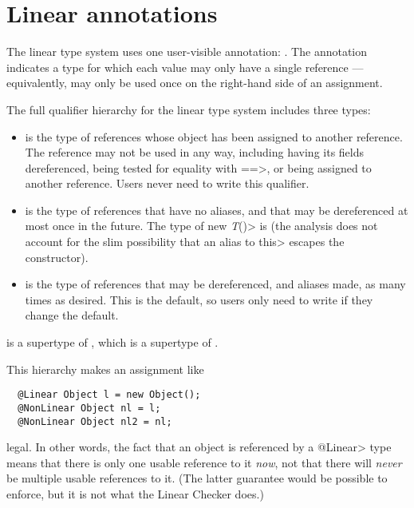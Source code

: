 \section{Linear annotations\label{linear-annotations}}

The linear type system uses one user-visible annotation:
.  The annotation indicates
a type for which each value may only have a single reference ---
equivalently, may only be used once on the right-hand side of an
assignment.

The full qualifier hierarchy for the linear type system includes three
types:
\begin{itemize}
\item
{} is the type of references whose object has been assigned to
another reference.  The reference may not be used in any way, including
having its fields dereferenced, being tested for equality with \<==>, or
being assigned to another reference.  Users never need to write this
qualifier.
\item
{} is the type of references that have no aliases, and that may
be dereferenced at most once in the future.  The type of \<new \emph{T}()> is
 (the analysis does not account for the slim
possibility that an alias to \<this> escapes the constructor).
\item
{} is the type of references that may be dereferenced, and
aliases made, as many times as desired.  This is the default, so users only
need to write  if they change the default.
\end{itemize}


\noindent
{} is a supertype of , which is a
supertype of .

This hierarchy makes an assignment like

\begin{Verbatim}
  @Linear Object l = new Object();
  @NonLinear Object nl = l;
  @NonLinear Object nl2 = nl;
\end{Verbatim}

\noindent
legal.  In other words, the fact that an object is referenced by a
\<@Linear> type means that there is only one usable reference to it \emph{now},
not that there will \emph{never} be multiple usable references to it.
(The latter guarantee would be possible to enforce, but it is not what the
Linear Checker does.)


